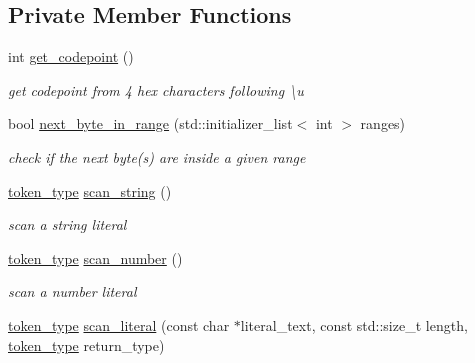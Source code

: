 \subsection*{Private Member Functions}
\begin{DoxyCompactItemize}
\item 
int \mbox{\hyperlink{classnlohmann_1_1detail_1_1lexer_a820b20e25ff255c3c791c37f2bf48380}{get\+\_\+codepoint}} ()
\begin{DoxyCompactList}\small\item\em get codepoint from 4 hex characters following {\ttfamily \textbackslash{}u} \end{DoxyCompactList}\item 
bool \mbox{\hyperlink{classnlohmann_1_1detail_1_1lexer_a2faa544ab5475523ead81f9cdef41a0a}{next\+\_\+byte\+\_\+in\+\_\+range}} (std\+::initializer\+\_\+list$<$ int $>$ ranges)
\begin{DoxyCompactList}\small\item\em check if the next byte(s) are inside a given range \end{DoxyCompactList}\item 
\mbox{\hyperlink{classnlohmann_1_1detail_1_1lexer_a3f313cdbe187cababfc5e06f0b69b098}{token\+\_\+type}} \mbox{\hyperlink{classnlohmann_1_1detail_1_1lexer_ad271045d1c91df9d6a119482b4aeae7f}{scan\+\_\+string}} ()
\begin{DoxyCompactList}\small\item\em scan a string literal \end{DoxyCompactList}\item 
\mbox{\hyperlink{classnlohmann_1_1detail_1_1lexer_a3f313cdbe187cababfc5e06f0b69b098}{token\+\_\+type}} \mbox{\hyperlink{classnlohmann_1_1detail_1_1lexer_a6bd7e6cdb0380a9df663f1c7f115f34f}{scan\+\_\+number}} ()
\begin{DoxyCompactList}\small\item\em scan a number literal \end{DoxyCompactList}\item 
\mbox{\hyperlink{classnlohmann_1_1detail_1_1lexer_a3f313cdbe187cababfc5e06f0b69b098}{token\+\_\+type}} \mbox{\hyperlink{classnlohmann_1_1detail_1_1lexer_a6f717deb553337736f27cdacccaee536}{scan\+\_\+literal}} (const char $\ast$literal\+\_\+text, const std\+::size\+\_\+t length, \mbox{\hyperlink{classnlohmann_1_1detail_1_1lexer_a3f313cdbe187cababfc5e06f0b69b098}{token\+\_\+type}} return\+\_\+type)
\item 
\mbox{\label{classnlohmann_1_1detail_1_1lexer_acba34bc18af19f93186e682d02c3942d}} 

\end{DoxyCompactItemize}
